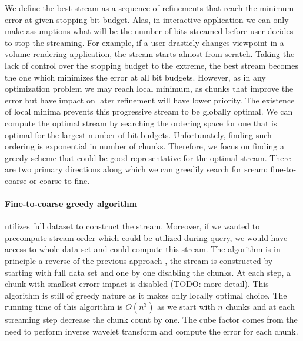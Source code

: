 We define the best stream as a sequence of refinements that reach the minimum error at given
stopping bit budget. Alas, in interactive application we can only make assumptions what will be the
number of bits streamed before user decides to stop the streaming. For example, if a user drasticly
changes viewpoint in a volume rendering application, the stream starts almost from scratch. Taking
the lack of control over the stopping budget to the extreme, the best stream becomes the one which
minimizes the error at all bit budgets. However, as in any optimization problem we may reach local
minimum, as chunks that improve the error but have impact on later refinement will have lower
priority.  The existence of local minima prevents this progressive stream to be
globally optimal. We can compute the optimal stream by searching the ordering space for one that is
optimal for the largest number of bit budgets. Unfortunately, finding such ordering is exponential
in number of chunks. Therefore, we focus on finding a greedy scheme that could be good
representative for the optimal stream. There are two primary directions along which we can greedily
search for sream: fine-to-coarse or coarse-to-fine.

\paragraph*{Fine-to-coarse greedy algorithm} utilizes full dataset to construct the stream.
Moreover, if we wanted to precompute stream order which could be utilized during query, we would
have access to whole data set and could compute this stream. The algorithm is in principle a reverse
of the previous approach , the stream is constructed by starting with full data set and one by one
disabling the chunks. At each step, a chunk with smallest errorr impact is disabled (TODO: more
detail). This algorithm is still of greedy nature as it makes only locally optimal choice. The
running time of this algorithm is $O(n^3)$ as we start with $n$ chunks and at each streaming step
decrease the chunk count by one. The cube factor comes from the need to perform inverse wavelet
transform and compute the error for each chunk.

